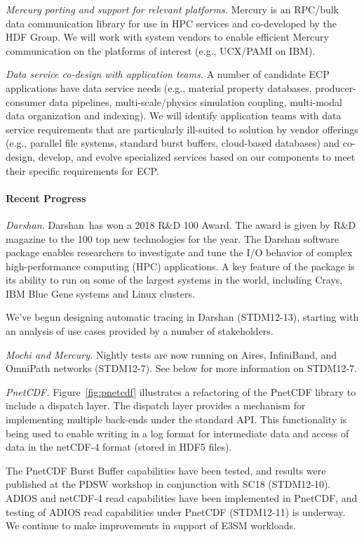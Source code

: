 \emph{Mercury porting and support for relevant platforms.}
Mercury is an RPC/bulk data communication library for use in HPC
services and co-developed by the HDF Group. We will work with system
vendors to enable efficient Mercury communication on the platforms of
interest (e.g., UCX/PAMI on IBM).

\emph{Data service co-design with application teams.}
A number of candidate ECP applications have data service needs (e.g.,
material property databases, producer-consumer data pipelines,
multi-scale/physics simulation coupling, multi-modal data organization
and indexing). We will identify application teams with data service
requirements that are particularly ill-suited to solution by vendor
offerings (e.g., parallel file systems, standard burst buffers,
cloud-based databases) and co-design, develop, and evolve specialized
services based on our components to meet their specific requirements
for ECP.

\paragraph{Recent Progress}

\emph{Darshan.}
Darshan has won a 2018 R\&D 100 Award. The award is given by R\&D magazine
to the 100 top new technologies for the year. The Darshan software
package enables researchers to investigate and tune the I/O behavior of
complex high-performance computing (HPC) applications. A key feature of
the package is its ability to run on some of the largest systems in the
world, including Crays, IBM Blue Gene systems and Linux clusters. 

We've begun designing automatic tracing in Darshan (STDM12-13), starting
with an analysis of use cases provided by a number of stakeholders.


\emph{Mochi and Mercury.}
Nightly tests are now running on Aires, InfiniBand, and OmniPath networks
(STDM12-7). See below for more information on STDM12-7.

\emph{PnetCDF.}
Figure~\ref{fig:pnetcdf} illustrates a refactoring of the PnetCDF
library to include a dispatch layer. The dispatch layer provides a
mechanism for implementing multiple back-ends under the standard
API. This functionality is being used to enable writing in a log
format for intermediate data and access of data in the netCDF-4 format
(stored in HDF5 files).

The PnetCDF Burst Buffer capabilities have been tested, and results were
published at the PDSW workshop in conjunction with SC18 (STDM12-10).
ADIOS and netCDF-4 read capabilities have been implemented in PnetCDF,
and testing of ADIOS read capabilities under PnetCDF (STDM12-11) is
underway.
%
We continue to make improvements in support of E3SM workloads.

